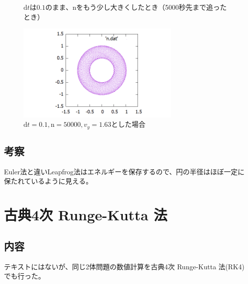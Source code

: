 \documentclass[a4paper,twoside]{jarticle}
\begin{document}
\begin{figure}[H]
$\mathrm{d}t$は$0.1$のまま、nをもう少し大きくしたとき（5000秒先まで追ったとき）
\begin{center}
\includegraphics[width=8cm]{../cpp/out/leap-frog/n_dt=e-1_n=50000.png}
\end{center}
\caption{$\mathrm{d}t=0.1, \mathrm{n}=50000, v_y=1.63$とした場合}
\end{figure}

\subsection{考察}
Euler法と違いLeapfrog法はエネルギーを保存するので、円の半径はほぼ一定に保たれているように見える。

\section{古典4次 Runge-Kutta 法}
\subsection{内容}
テキストにはないが、同じ2体問題の数値計算を古典4次 Runge-Kutta 法(RK4)でも行った。
\end{document}
